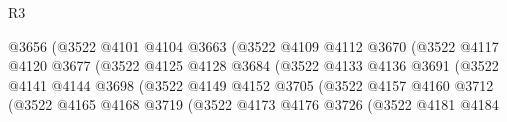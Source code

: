 \begin{lexlean}{R3}
\begin{coremodule}
                                          @3656
                                          (@3522
                                            @4101
                                            @4104
                                            @3663
                                            (@3522
                                              @4109
                                              @4112
                                              @3670
                                              (@3522
                                                @4117
                                                @4120
                                                @3677
                                                (@3522
                                                  @4125
                                                  @4128
                                                  @3684
                                                  (@3522
                                                    @4133
                                                    @4136
                                                    @3691
                                                    (@3522
                                                      @4141
                                                      @4144
                                                      @3698
                                                      (@3522
                                                        @4149
                                                        @4152
                                                        @3705
                                                        (@3522
                                                          @4157
                                                          @4160
                                                          @3712
                                                          (@3522
                                                            @4165
                                                            @4168
                                                            @3719
                                                            (@3522
                                                              @4173
                                                              @4176
                                                              @3726
                                                              (@3522
                                                                @4181
                                                                @4184

\end{coremodule}
\end{lexlean}
